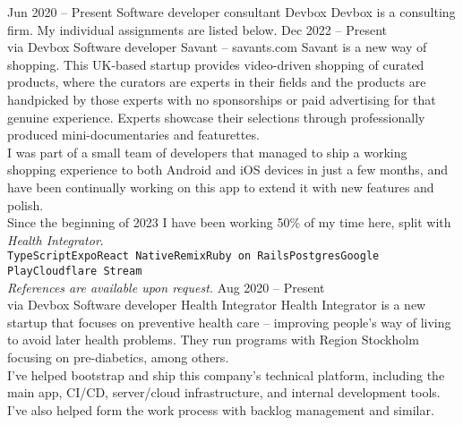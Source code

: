 \documentclass[9pt]{developercv} %
\begin{document}

\pagebreak
{}

\begin{entrylist}
  \entry
    {Jun 2020 -- Present}
    {Software developer consultant}
    {Devbox}
    {Devbox is a consulting firm. My individual assignments are listed below.}
  \entry
    {Dec 2022 -- Present\\\footnotesize{via Devbox}}
    {Software developer}
    {Savant -- savants.com}
    {Savant is a new way of shopping. This UK-based startup provides
    video-driven shopping of curated products, where the curators are experts
    in their fields and the products are handpicked by those experts with no
    sponsorships or paid advertising for that genuine experience. Experts
    showcase their selections through professionally produced
    mini-documentaries and featurettes.\\
    I was part of a small team of developers that managed to ship a working
    shopping experience to both Android and iOS devices in just a few months,
    and have been continually working on this app to extend it with new
    features and polish.\\
    Since the beginning of 2023 I have been working 50\% of my time here, split
    with \textit{Health Integrator}.\\
      \texttt{TypeScript}\slashsep\texttt{Expo}\slashsep\texttt{React
      Native}\slashsep\texttt{Remix}\slashsep\texttt{Ruby on
      Rails}\slashsep\texttt{Postgres}\slashsep\texttt{Google
      Play}\slashsep\texttt{Cloudflare Stream}\\
    \textit{References are available upon request.}
    }
  \entry
    {Aug 2020 -- Present\\\footnotesize{via Devbox}}
    {Software developer}
    {Health Integrator}
    {Health Integrator is a new startup that focuses on preventive health care
    -- improving people's way of living to avoid later health problems. They
    run programs with Region Stockholm focusing on pre-diabetics, among
    others.\\ I've helped bootstrap and ship this company's technical platform,
    including the main app, CI/CD, server/cloud infrastructure, and internal
    development tools. I've also helped form the work process with backlog
    management and similar.\\
}
\end{entrylist}
\end{document}
